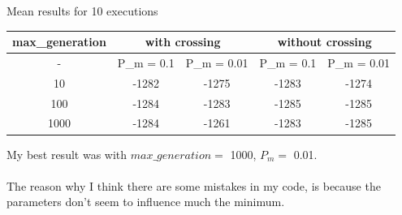 \documentclass[a4paper]{article}
\begin{document}
\begin{center}
Mean results for 10 executions\\
\begin{tabular}{|c|cc|cc|}
\hline
{\color[HTML]{000000} max\_generation} & \multicolumn{2}{c|}{{\color[HTML]{000000} with crossing}}                                   & \multicolumn{2}{c|}{{\color[HTML]{000000} without crossing}}                                \\ \hline
{\color[HTML]{000000} -}               & \multicolumn{1}{c|}{{\color[HTML]{000000} P\_m = 0.1}} & {\color[HTML]{000000} P\_m = 0.01} & \multicolumn{1}{c|}{{\color[HTML]{000000} P\_m = 0.1}} & {\color[HTML]{000000} P\_m = 0.01} \\ \hline
{\color[HTML]{000000} 10}              & \multicolumn{1}{c|}{{\color[HTML]{000000} -1282}}      & {\color[HTML]{000000} -1275}       & \multicolumn{1}{c|}{{\color[HTML]{000000} -1283}}      & {\color[HTML]{000000} -1274}       \\ \hline
{\color[HTML]{000000} 100}             & \multicolumn{1}{c|}{{\color[HTML]{000000} -1284}}      & {\color[HTML]{000000} -1283}       & \multicolumn{1}{c|}{{\color[HTML]{000000} -1285}}      & {\color[HTML]{000000} -1285}       \\ \hline
{\color[HTML]{000000} 1000}            & \multicolumn{1}{c|}{{\color[HTML]{000000} -1284}}      & {\color[HTML]{000000} -1261}       & \multicolumn{1}{c|}{{\color[HTML]{000000} -1283}}      & {\color[HTML]{000000} -1285}       \\ \hline
\end{tabular}
\end{center}
My best result was with $max\_generation =$ 1000, $P_m =$ 0.01.\\\\
The reason why I think there are some mistakes in my code, is because the parameters don't seem to influence much the minimum.
\end{document}
